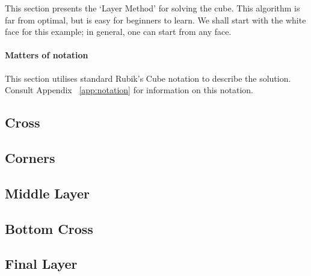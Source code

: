 This section presents the `Layer Method' for solving the cube. This algorithm is far from optimal, but is easy for beginners to learn. We shall start with the white face for this example; in general, one can start from any face.

\paragraph{Matters of notation} This section utilises standard Rubik's Cube notation to describe the solution. Consult Appendix ~\ref{app:notation} for information on this notation.

\subsection{Cross}

\newpage

\subsection{Corners}

\newpage

\subsection{Middle Layer}

\newpage

\subsection{Bottom Cross}\label{step:botcross}

\newpage

\subsection{Final Layer}

\newpage
